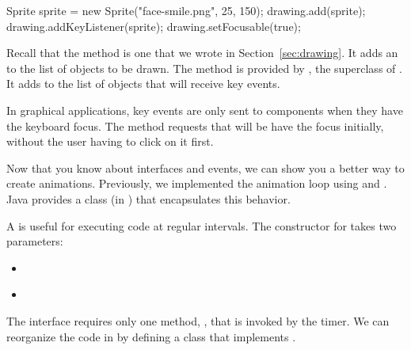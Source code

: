 \begin{code}
Sprite sprite = new Sprite("face-smile.png", 25, 150);
drawing.add(sprite);
drawing.addKeyListener(sprite);
drawing.setFocusable(true);
\end{code}

Recall that the  method is one that we wrote in Section~\ref{sec:drawing}.
It adds an  to the list of objects to be drawn.
The  method is provided by , the superclass of .
It adds  to the list of objects that will receive key events.

In graphical applications, key events are only sent to components when they have the keyboard focus.
The  method requests that  will be have the focus initially, without the user having to click on it first.


Now that you know about interfaces and events, we can show you a better way to create animations.
Previously, we implemented the animation loop using  and .
Java provides a  class (in ) that encapsulates this behavior.

A  is useful for executing code at regular intervals.
The constructor for  takes two parameters:

\begin{itemize}
\item {} {\tt ~~~~~~~~~~~~~~~} 

\item {} {\tt ~} 
\end{itemize}

The  interface requires only one method, , that is invoked by the timer.
We can reorganize the code in  by defining a class that implements .

